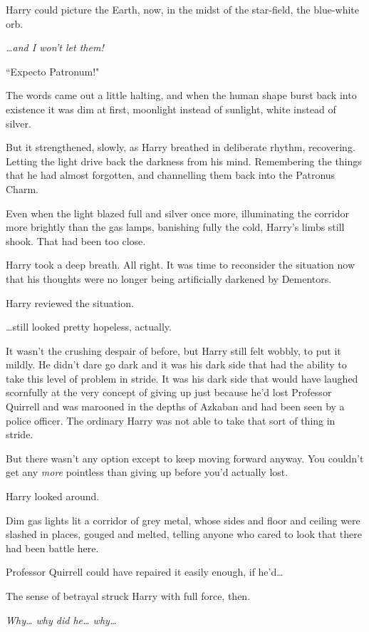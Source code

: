 Harry could picture the Earth, now, in the midst of the star-field, the blue-white orb.

\emph{{\ldots}and I won't let them!}

``Expecto Patronum!"

The words came out a little halting, and when the human shape burst back into existence it was dim at first, moonlight instead of sunlight, white instead of silver.

But it strengthened, slowly, as Harry breathed in deliberate rhythm, recovering. Letting the light drive back the darkness from his mind. Remembering the things that he had almost forgotten, and channelling them back into the Patronus Charm.

Even when the light blazed full and silver once more, illuminating the corridor more brightly than the gas lamps, banishing fully the cold, Harry's limbs still shook. That had been too close.

Harry took a deep breath. All right. It was time to reconsider the situation now that his thoughts were no longer being artificially darkened by Dementors.

Harry reviewed the situation.

{\ldots}still looked pretty hopeless, actually.

It wasn't the crushing despair of before, but Harry still felt wobbly, to put it mildly. He didn't dare go dark and it was his dark side that had the ability to take this level of problem in stride. It was his dark side that would have laughed scornfully at the very concept of giving up just because he'd lost Professor Quirrell and was marooned in the depths of Azkaban and had been seen by a police officer. The ordinary Harry was not able to take that sort of thing in stride.

But there wasn't any option except to keep moving forward anyway. You couldn't get any \emph{more} pointless than giving up before you'd actually lost.

Harry looked around.

Dim gas lights lit a corridor of grey metal, whose sides and floor and ceiling were slashed in places, gouged and melted, telling anyone who cared to look that there had been battle here.

Professor Quirrell could have repaired it easily enough, if he'd{\ldots}

The sense of betrayal struck Harry with full force, then.

\emph{Why{\ldots} why did he{\ldots} why{\ldots}}

